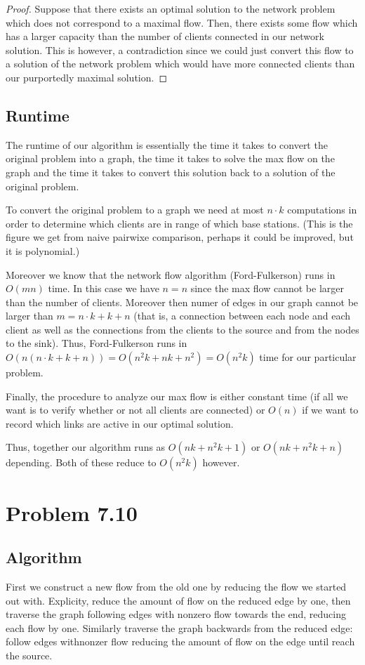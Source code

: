 \documentclass{article}
\begin{document}
\begin{proof}
Suppose that there exists an optimal solution to the network problem which does not correspond to a maximal flow. Then, there exists some flow which has a larger capacity than the number of clients connected in our network solution. This is however, a contradiction since we could just convert this flow to a solution of the network problem which would have more connected clients than our purportedly maximal solution.
\end{proof}

\subsection{Runtime}
The runtime of our algorithm is essentially the time it takes to convert the original problem into a graph, the time it takes to solve the max flow on the graph and the time it takes to convert this solution back to a solution of the original problem.

To convert the original problem to a graph we need at most $n\cdot k$ computations in order to determine which clients are in range of which base stations. (This is the figure we get from naive pairwixe comparison, perhaps it could be improved, but it is polynomial.)

Moreover we know that the network flow algorithm (Ford-Fulkerson) runs in $O(m n)$ time. In this case we have $n=n$ since the max flow cannot be larger than the number of clients. Moreover then numer of edges in our graph cannot be larger than $m=n \cdot k+k+n$ (that is, a connection between each node and each client as well as the connections from the clients to the source and from the nodes to the sink). Thus, Ford-Fulkerson runs in $O(n(n \cdot k +k+n))=O(n^2k+nk+n^2)=O(n^2k)$ time for our particular problem.

Finally, the procedure to analyze our max flow is either constant time (if all we want is to verify whether or not all clients are connected) or $O(n)$ if we want to record which links are active in our optimal solution.

Thus, together our algorithm runs as  $O(nk+n^2k+1)$ or $O(nk+n^2k +n)$ depending. Both of these reduce to $O(n^2k)$ however.
\section{Problem 7.10}
\subsection{Algorithm}
First we construct a new flow from the old one by reducing the flow we started out with. Explicity, reduce the amount of flow on the reduced edge by one, then traverse the graph following edges with nonzero flow towards the end, reducing each flow by one. Similarly traverse the graph backwards from the reduced edge: follow edges withnonzer flow reducing the amount of flow on the edge until reach the source.
\end{document}
